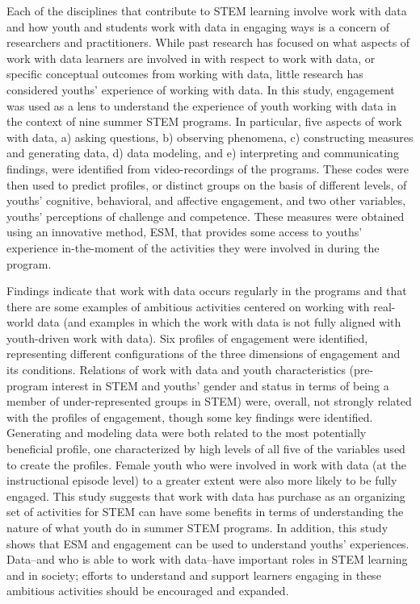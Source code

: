 \documentclass[]{msu-thesis}
\theoremstyle{definition}
\theoremstyle{definition}
\theoremstyle{definition}
\theoremstyle{remark}
\begin{document}
Each of the disciplines that contribute to STEM learning involve work
with data and how youth and students work with data in engaging ways is
a concern of researchers and practitioners. While past research has
focused on what aspects of work with data learners are involved in with
respect to work with data, or specific conceptual outcomes from working
with data, little research has considered youths' experience of working
with data. In this study, engagement was used as a lens to understand
the experience of youth working with data in the context of nine summer
STEM programs. In particular, five aspects of work with data, a) asking
questions, b) observing phenomena, c) constructing measures and
generating data, d) data modeling, and e) interpreting and communicating
findings, were identified from video-recordings of the programs. These
codes were then used to predict profiles, or distinct groups on the
basis of different levels, of youths' cognitive, behavioral, and
affective engagement, and two other variables, youths' perceptions of
challenge and competence. These measures were obtained using an
innovative method, ESM, that provides some access to youths' experience
in-the-moment of the activities they were involved in during the
program.

Findings indicate that work with data occurs regularly in the programs
and that there are some examples of ambitious activities centered on
working with real-world data (and examples in which the work with data
is not fully aligned with youth-driven work with data). Six profiles of
engagement were identified, representing different configurations of the
three dimensions of engagement and its conditions. Relations of work
with data and youth characteristics (pre-program interest in STEM and
youths' gender and status in terms of being a member of
under-represented groups in STEM) were, overall, not strongly related
with the profiles of engagement, though some key findings were
identified. Generating and modeling data were both related to the most
potentially beneficial profile, one characterized by high levels of all
five of the variables used to create the profiles. Female youth who were
involved in work with data (at the instructional episode level) to a
greater extent were also more likely to be fully engaged. This study
suggests that work with data has purchase as an organizing set of
activities for STEM can have some benefits in terms of understanding the
nature of what youth do in summer STEM programs. In addition, this study
shows that ESM and engagement can be used to understand youths'
experiences. Data--and who is able to work with data--have important
roles in STEM learning and in society; efforts to understand and support
learners engaging in these ambitious activities should be encouraged and
expanded.
\end{document}
